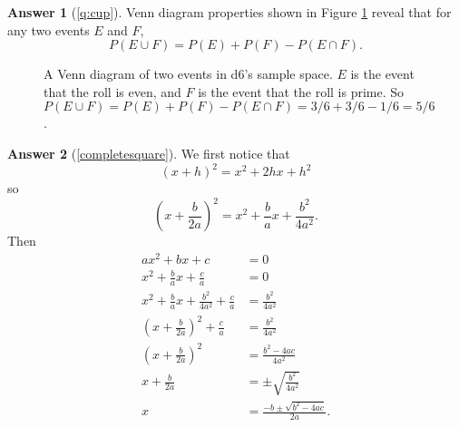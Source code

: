 \documentclass{book}
\theoremstyle{definition}
\newtheorem*{exercise*}{Answer}
\theoremstyle{colonstylebf}
\begin{document}
\begin{exercise*}[\ref{q:cup}]
Venn diagram properties shown in Figure \ref{vennd} reveal that for any two events $E$ and $F$, \[P(E \cup F) = P(E) + P(F) - P(E \cap F).\]
\begin{figure}[ht]
\centering
{}
\caption{A Venn diagram of two events in d6's sample space. $E$ is the event that the roll is even, and $F$ is the event that the roll is prime. So $P(E \cup F) = P(E) + P(F) - P(E \cap F) = 3/6 + 3/6 - 1/6 = 5/6$.}
\label{vennd}
\end{figure}
\end{exercise*}

\begin{exercise*}[{\ref{completesquare}}] We first notice that
\[(x + h)^2 = x^2 + 2hx + h^2\] so \[\left(x + \frac{b}{2a}\right)^2 = x^2 + \frac{b}{a}x + \frac{b^2}{4a^2}.\] Then
\begin{align*}
ax^2 + bx + c &= 0\\
x^2 + \frac{b}{a}x + \frac{c}{a} &= 0\\
x^2 + \frac{b}{a}x + \frac{b^2}{4a^2} + \frac{c}{a} &= \frac{b^2}{4a^2}\\
\left(x + \frac{b}{2a}\right)^2 + \frac{c}{a} &= \frac{b^2}{4a^2}\\
\left(x + \frac{b}{2a}\right)^2 &= \frac{b^2-4ac}{4a^2}\\
x + \frac{b}{2a} &= \pm\sqrt{\frac{b^2}{4a^2}}\\
x &= \frac{-b \pm \sqrt{b^2 - 4ac}}{2a}.
\end{align*}
\end{exercise*}
\end{document}

